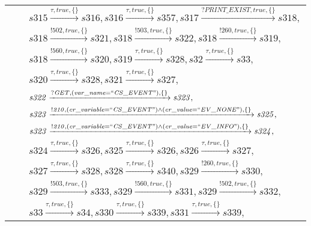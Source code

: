 \begin{tabular}{lcl}
& & $\mathit{s315}\xrightarrow{\mathit{\tau}, \mathit{true}, \{\}}\mathit{s316},\mathit{s316}\xrightarrow{\mathit{\tau}, \mathit{true}, \{\}}\mathit{s357},\mathit{s317}\xrightarrow{\mathit{?PRINT\_EXIST}, \mathit{true}, \{\}}\mathit{s318},$ \\
& & $\mathit{s318}\xrightarrow{\mathit{!502}, \mathit{true}, \{\}}\mathit{s321},\mathit{s318}\xrightarrow{\mathit{!503}, \mathit{true}, \{\}}\mathit{s322},\mathit{s318}\xrightarrow{\mathit{!260}, \mathit{true}, \{\}}\mathit{s319},$ \\
& & $\mathit{s318}\xrightarrow{\mathit{!560}, \mathit{true}, \{\}}\mathit{s320},\mathit{s319}\xrightarrow{\mathit{\tau}, \mathit{true}, \{\}}\mathit{s328},\mathit{s32}\xrightarrow{\mathit{\tau}, \mathit{true}, \{\}}\mathit{s33},$ \\
& & $\mathit{s320}\xrightarrow{\mathit{\tau}, \mathit{true}, \{\}}\mathit{s328},\mathit{s321}\xrightarrow{\mathit{\tau}, \mathit{true}, \{\}}\mathit{s327},$ \\
& & $\mathit{s322}\xrightarrow{\mathit{?GET}, \mathit{(var\_name = ``CS\_EVENT")}, \{\}}\mathit{s323},$ \\
& & $\mathit{s323}\xrightarrow{\mathit{!210}, \mathit{(cr\_variable = ``CS\_EVENT") \land (cr\_value = ``EV\_NONE")}, \{\}}\mathit{s325},$ \\
& & $\mathit{s323}\xrightarrow{\mathit{!210}, \mathit{(cr\_variable = ``CS\_EVENT") \land (cr\_value = ``EV\_INFO")}, \{\}}\mathit{s324},$ \\
& & $\mathit{s324}\xrightarrow{\mathit{\tau}, \mathit{true}, \{\}}\mathit{s326},\mathit{s325}\xrightarrow{\mathit{\tau}, \mathit{true}, \{\}}\mathit{s326},\mathit{s326}\xrightarrow{\mathit{\tau}, \mathit{true}, \{\}}\mathit{s327},$ \\
& & $\mathit{s327}\xrightarrow{\mathit{\tau}, \mathit{true}, \{\}}\mathit{s328},\mathit{s328}\xrightarrow{\mathit{\tau}, \mathit{true}, \{\}}\mathit{s340},\mathit{s329}\xrightarrow{\mathit{!260}, \mathit{true}, \{\}}\mathit{s330},$ \\
& & $\mathit{s329}\xrightarrow{\mathit{!503}, \mathit{true}, \{\}}\mathit{s333},\mathit{s329}\xrightarrow{\mathit{!560}, \mathit{true}, \{\}}\mathit{s331},\mathit{s329}\xrightarrow{\mathit{!502}, \mathit{true}, \{\}}\mathit{s332},$ \\
& & $\mathit{s33}\xrightarrow{\mathit{\tau}, \mathit{true}, \{\}}\mathit{s34},\mathit{s330}\xrightarrow{\mathit{\tau}, \mathit{true}, \{\}}\mathit{s339},\mathit{s331}\xrightarrow{\mathit{\tau}, \mathit{true}, \{\}}\mathit{s339},$ \\

\end{tabular}
